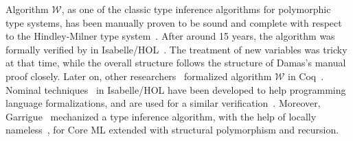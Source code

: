 Algorithm $\mathcal{W}$,
as one of the classic type inference algorithms for polymorphic type systems,
has been manually proven to be sound and complete
with respect to the Hindley-Milner type system~\citep{hindley1969principal,milner1978theory,damas1982principal}.
After around 15 years, the algorithm was formally verified by
\citet{naraschewski1999type} in Isabelle/HOL~\citep{nipkow2002isabelle}.
The treatment of new variables was tricky at that time, while the overall structure follows the
structure of Damas's manual proof closely.
Later on, other researchers~\citep{dubois2000proving,dubois1999certification}
formalized algorithm $\mathcal{W}$ in Coq~\citep{Coq}.
Nominal techniques~\citep{urban2008nominalTech} in Isabelle/HOL have been
developed to help programming language formalizations, and are used for a similar
verification~\citep{urban2008nominal}. Moreover, Garrigue~\citep{garrigue2015certified}
mechanized a type inference algorithm,
with the help of locally nameless~\citep{LocallyNameless},
for Core ML extended with structural polymorphism and recursion.

